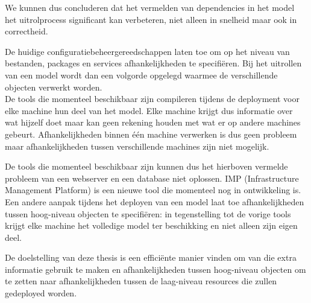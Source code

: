 We kunnen dus concluderen dat het vermelden van dependencies in het model het uitrolprocess significant kan verbeteren, niet alleen in snelheid maar ook in correctheid.

De huidige configuratiebeheergereedschappen laten toe om op het niveau van bestanden, packages en services afhankelijkheden te specifi\"eren.
Bij het uitrollen van een model wordt dan een volgorde opgelegd waarmee de verschillende objecten verwerkt worden.
\\
De tools die momenteel beschikbaar zijn compileren tijdens de deployment voor elke machine hun deel van het model.
Elke machine krijgt dus informatie over wat hijzelf doet maar kan geen rekening houden met wat er op andere machines gebeurt.
Afhankelijkheden binnen \'e\'en machine verwerken is dus geen probleem maar afhankelijkheden tussen verschillende machines zijn niet mogelijk. 

De tools die momenteel beschikbaar zijn kunnen dus het hierboven vermelde probleem van een webserver en een database niet oplossen.
IMP (Infrastructure Management Platform) is een nieuwe tool die momenteel nog in ontwikkeling is.
Een andere aanpak tijdens het deployen van een model laat toe afhankelijkheden tussen hoog-niveau objecten te specifi\"eren:
in tegenstelling tot de vorige tools krijgt elke machine het volledige model ter beschikking en niet alleen zijn eigen deel.

De doelstelling van deze thesis is een effici\"ente manier vinden om van die extra informatie gebruik te maken en afhankelijkheden tussen hoog-niveau objecten om te zetten naar afhankelijkheden tussen de laag-niveau resources die zullen gedeployed worden.


